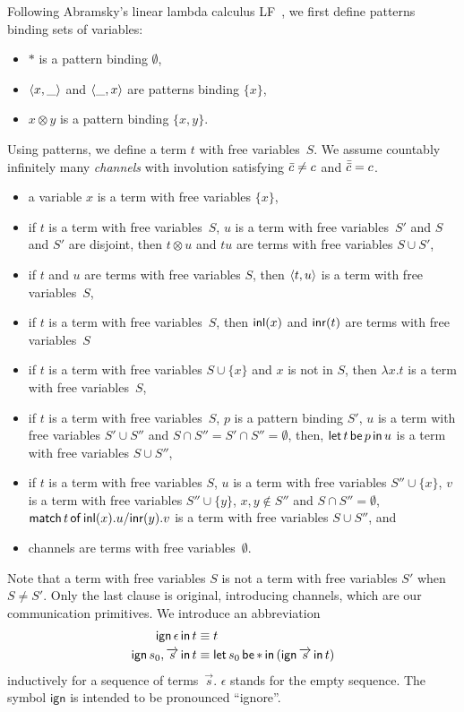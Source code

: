 Following Abramsky's linear lambda calculus
LF~\citep{abramsky1993computational}, we first define patterns
binding sets of variables:
\begin{itemize}
 \item $\ast$ is a pattern binding $\emptyset$,
 \item $\langle{x,\_}\rangle$ and $\langle{\_,x}\rangle$ are patterns binding $\{x\}$,
 \item $x\otimes y$ is a pattern binding $\{x,y\}$.
\end{itemize}
Using patterns, we define a term $t$ with free variables~$S$.
We assume countably infinitely many \textit{channels}
with involution satisfying $\bar{c}\neq c$ and $\bar{\bar{c}} = c$.
\begin{itemize}
 \item a variable $x$ is a term with free variables $\{x\}$,
 \item if $t$ is a term with free variables~$S$, $u$ is a term with
       free variables~$S'$ and $S$ and $S'$ are disjoint, then $t\otimes
       u$ and
       $tu$ are terms with free variables $S\cup S'$,
 \item if $t$ and $u$ are terms with free variables $S$, then
       $\langle{t,u}\rangle$ is a term with free variables~$S$,
 \item if $t$ is a term with free variables~$S$, then
       $\mathsf{inl}({x})$ and $\mathsf{inr}({t})$ are terms with free variables~$S$
 \item if $t$ is a term with free variables $S\cup \{x\}$ and $x$ is not
       in $S$, then $\lambda x.t$ is a term with free variables~$S$,
 \item if $t$ is a term with free variables~$S$, $p$ is a pattern
       binding $S'$, $u$ is a term with free variables $S'\cup S''$ and
       $S\cap S'' = S'\cap S'' = \emptyset$, then,
       $\mathsf{let }\,{t}\,\mathsf{ be }\,{p}\,\mathsf{ in }\,{u}$ is a term with free variables $S\cup S''$,
 \item if $t$ is a term with free variables $S$,
       $u$ is a term with free variables $S''\cup \{x\}$,
       $v$ is a term with free variables $S''\cup \{y\}$,
       $x,y\notin S''$ and $S\cap S'' = \emptyset$,
       $\mathsf{match}\,{t}\,\mathsf{of}\, \mathsf{inl}({x}). {u}/ \mathsf{inr}({y}). {v}$ is a term with free variables $S\cup S''$, and
 \item channels are terms with free variables~$\emptyset$.
\end{itemize}
Note that a term with free variables $S$ is not a term with free
variables $S'$ when $S\neq S'$.  Only the last clause is original,
introducing channels, which are our communication primitives.
We introduce an abbreviation
\begin{align*}
 \mathsf{ign }\,{\epsilon}\,\mathsf{ in }\,{t}   & \equiv t\\
 \mathsf{ign }\,{s_0,\overrightarrow s}\,\mathsf{ in }\,{t} & \equiv \mathsf{let }\,{s_0}\,\mathsf{ be }\,{\ast}\,\mathsf{ in }\,{(\mathsf{ign }\,{\overrightarrow s}\,\mathsf{ in }\,{t})}
\end{align*}
inductively for a sequence of terms~$\vec s$.
$\epsilon$ stands for the empty sequence.
The symbol $\mathsf{ign}$ is intended to be pronounced ``ignore''.

